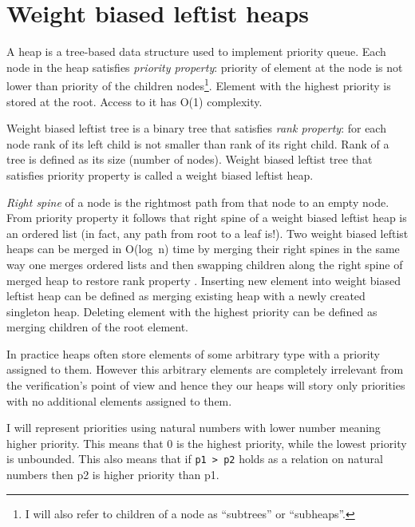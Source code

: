 \section{Weight biased leftist heaps}\label{sec:wblh}

A heap is a tree-based data structure used to implement priority queue. Each node in the heap satisfies \textit{priority property}: priority of element at the node is not lower than priority of the children nodes\footnote{I will also refer to children of a node as ``subtrees'' or ``subheaps''.}. Element with the highest priority is stored at the root. Access to it has O(1) complexity.

Weight biased leftist tree \cite{ChoSah96} is a binary tree that satisfies \textit{rank property}: for each node rank of its left child is not smaller than rank of its right child. Rank of a tree is defined as its size (number of nodes). Weight biased leftist tree that satisfies priority property is called a weight biased leftist heap.

\textit{Right spine} of a node is the rightmost path from that node to an empty node. From priority property it follows that right spine of a weight biased leftist heap is an ordered list (in fact, any path from root to a leaf is!). Two weight biased leftist heaps can be merged in O(log~n) time by merging their right spines in the same way one merges ordered lists and then swapping children along the right spine of merged heap to restore rank property \cite{Oka99}. Inserting new element into weight biased leftist heap can be defined as merging existing heap with a newly created singleton heap. Deleting element with the highest priority can be defined as merging children of the root element.

In practice heaps often store elements of some arbitrary type with a priority assigned to them. However this arbitrary elements are completely irrelevant from the verification's point of view and hence they our heaps will story only priorities with no additional elements assigned to them.

I will represent priorities using natural numbers with lower number meaning higher priority. This means that 0 is the highest priority, while the lowest priority is unbounded. This also means that if \texttt{p1 > p2} holds as a relation on natural numbers then p2 is higher priority than p1.